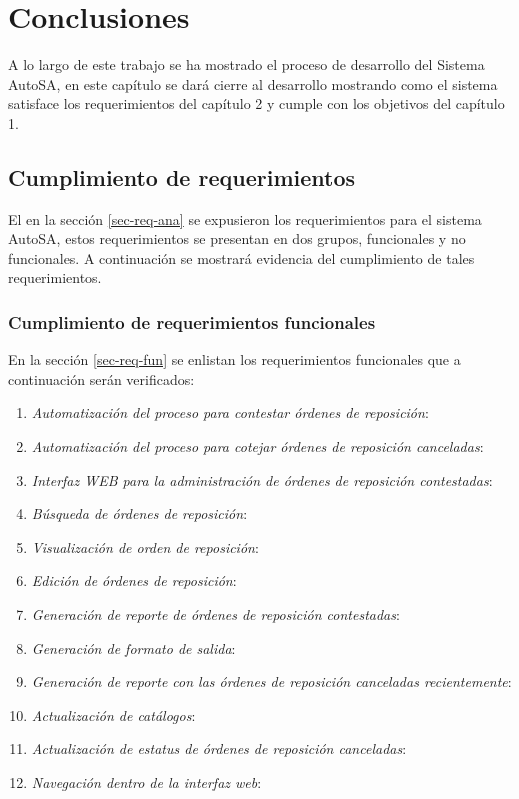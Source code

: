 \chapter{Conclusiones}\label{cap5}

A lo largo de este trabajo se ha mostrado el proceso de desarrollo del Sistema AutoSA, en este capítulo se dará cierre al desarrollo mostrando como el sistema satisface los requerimientos del capítulo 2 y cumple con los objetivos del capítulo 1.

\section{Cumplimiento de requerimientos}
El en la sección \ref{sec-req-ana} se expusieron los requerimientos para el sistema AutoSA, estos requerimientos se presentan en dos grupos, funcionales y no funcionales. A continuación se mostrará evidencia del cumplimiento de tales requerimientos.

\subsection{Cumplimiento de requerimientos funcionales}
En la sección \ref{sec-req-fun} se enlistan los requerimientos funcionales que a continuación serán verificados:
\begin{enumerate}
	\item \textit{Automatización del proceso para contestar órdenes de reposición}: 
	\item \textit{Automatización del proceso para cotejar órdenes de reposición canceladas}: 
	\item \textit{Interfaz WEB para la administración de órdenes de reposición contestadas}: 
	\item \textit{Búsqueda de órdenes de reposición}: 
	\item \textit{Visualización de orden de reposición}: 
	\item \textit{Edición de órdenes de reposición}: 
	\item \textit{Generación de reporte de órdenes de reposición contestadas}: 
	\item \textit{Generación de formato de salida}: 
	\item \textit{Generación de reporte con las órdenes de reposición canceladas recientemente}: 
	\item \textit{Actualización de catálogos}: 
	\item \textit{Actualización de estatus de órdenes de reposición canceladas}: 
	\item \textit{Navegación dentro de la interfaz web}: 
\end{enumerate}

